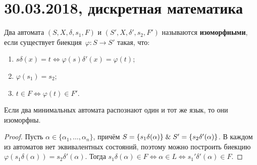 \chapter{30.03.2018, дискретная математика}
Два автомата $(S, X, \delta, s_1, F)$ и $(S', X, \delta', s_2, F')$ называются \textbf{изоморфными}, если существует биекция~$\varphi \colon S \to S'$ такая, что:
\begin{enumerate}
	\item $s \delta(x) = t \Leftrightarrow \varphi(s) \delta'(x) = \varphi(t)$;
	\item $\varphi(s_1) = s_2$;
	\item $t \in F \Leftrightarrow \varphi(t) \in F'$.
\end{enumerate}

\begin{statement}
Если два минимальных автомата распознают один и тот же язык, то они изоморфны.
\end{statement}
\begin{proof}
Пусть $\alpha \in \{ \alpha_1, \ldots, \alpha_n \}$, причём $S = \{ s_1 \delta(\alpha) \} \mathrel{\&} S' = \{ s_2 \delta'(\alpha) \}$.
В каждом из автоматов нет эквивалентных состояний, поэтому можно построить биекцию~$\varphi(s_1 \delta(\alpha)) = s_2 \delta'(\alpha)$.
Тогда $s_1 \delta(\alpha) \in F \Leftrightarrow \alpha \in L \Leftrightarrow s_1' \delta'(\alpha) \in F$.
\end{proof}


